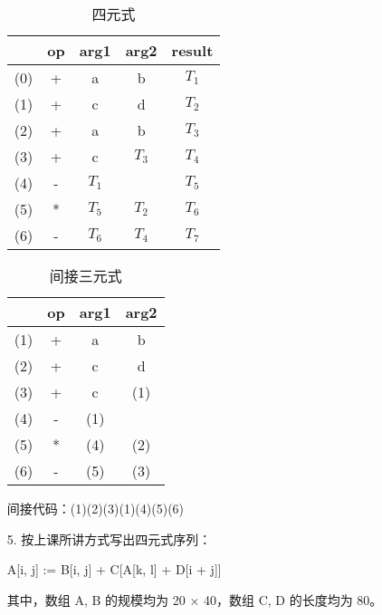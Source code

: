 \documentclass[]{ctexart}
\begin{document}
\begin{enumerate}
	\begin{table}[H]
		\centering
		\caption{四元式}
		\begin{tabular}{|c|c|c|c|c|}
			\hline
			~ & op & arg1 & arg2 & result \\\hline
			(0) & + & a & b & $T_{1}$\\
			(1) & + & c & d & $T_{2}$\\
			(2) & + & a & b & $T_{3}$\\
			(3) & + & c & $T_{3}$ & $T_{4}$ \\
			(4) & - & $T_{1}$ & ~ & $T_{5}$\\
			(5) & * & $T_{5}$ & $T_{2}$ & $T_{6}$ \\
			(6) & - & $T_{6}$ & $T_{4}$ & $T_{7}$ \\\hline
		\end{tabular}
	\end{table}

	\begin{table}[H]
		\centering
		\caption{间接三元式}
		\begin{tabular}{|c|c|c|c|}
			\hline
			~ & op & arg1 & arg2 \\\hline
			(1) & + & a & b \\
			(2) & + & c & d \\
			(3) & + & c & (1) \\
			(4) & - & (1) & ~ \\
			(5) & * & (4) & (2) \\
			(6) & - & (5) & (3) \\\hline
		\end{tabular}
	\end{table}
	间接代码：(1)(2)(3)(1)(4)(5)(6)
		
	\item[5.] 按上课所讲方式写出四元式序列：
	\begin{center}
		A[i, j] := B[i, j] + C[A[k, l] + D[i + j]]
	\end{center}
	其中，数组 A, B 的规模均为 20 × 40，数组 C, D 的长度均为 80。

\end{enumerate}
\end{document}

